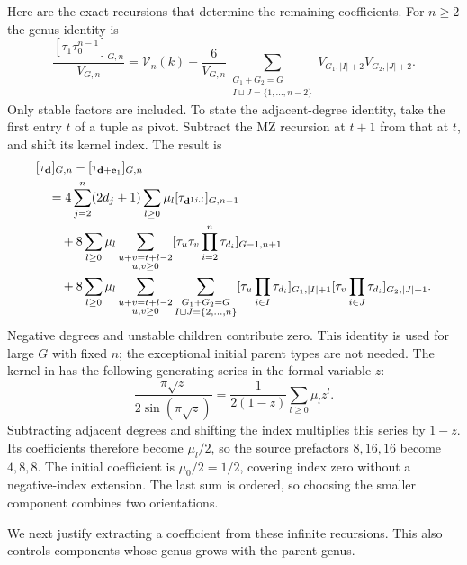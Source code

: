 \documentclass[a4paper,10pt]{article}
\numberwithin{equation}{section}
\theoremstyle{paperplain}
\theoremstyle{paperremark}
\theoremstyle{paperplain}
\begin{document}
Here are the exact recursions that determine the remaining coefficients.
For $n\geq2$ the genus identity is
\begin{equation}\label{eq:a:exact-genus}
 \frac{[\tau_1\tau_0^{n-1}]_{G,n}}{V_{G,n}}
 =\mathcal V_n(k)+\frac6{V_{G,n}}
 \sum_{\substack{G_1+G_2=G\\I\sqcup J=\{1,\ldots,n-2\}}}
        V_{G_1,|I|+2}V_{G_2,|J|+2}.
\end{equation}
Only stable factors are included. To state the adjacent-degree identity,
take the first entry $t$ of a tuple as pivot. Subtract the MZ recursion
at $t+1$ from that at $t$, and shift its kernel index. The result is
\begin{align}
 &[\tau_{\mathbf d}]_{G,n}
       -[\tau_{\mathbf d+\mathbf e_1}]_{G,n}\notag\\
 &\quad=4\sum_{j=2}^n(2d_j+1)\sum_{l\geq0}\mu_l
                            [\tau_{\mathbf d^{1j,l}}]_{G,n-1}\notag\\
 &\qquad+8\sum_{l\geq0}\mu_l
       \sum_{\substack{u+v=t+l-2\\u,v\geq0}}
                   [\tau_u\tau_v\prod_{i=2}^n\tau_{d_i}]_{G-1,n+1}\notag\\
 &\qquad+8\sum_{l\geq0}\mu_l
       \sum_{\substack{u+v=t+l-2\\u,v\geq0}}
       \sum_{\substack{G_1+G_2=G\\I\sqcup J=\{2,\ldots,n\}}}
       [\tau_u\prod_{i\in I}\tau_{d_i}]_{G_1,|I|+1}
       [\tau_v\prod_{i\in J}\tau_{d_i}]_{G_2,|J|+1}.
 \label{eq:a:exact-adjacent}
\end{align}
Negative degrees and unstable children contribute zero. This identity
is used for large $G$ with fixed $n$; the exceptional initial parent
types are not needed. The kernel in \cite[(4.4)--(4.7)]{HMT25} has
the following generating series in the formal variable $z$:
\[
 \frac{\pi\sqrt z}{2\sin(\pi\sqrt z)}
   =\frac1{2(1-z)}\sum_{l\geq0}\mu_l z^l.
\]
Subtracting adjacent degrees and shifting the index multiplies this
series by $1-z$. Its coefficients therefore become $\mu_l/2$, so
the source prefactors $8,16,16$ become $4,8,8$. The initial coefficient
is $\mu_0/2=1/2$, covering index zero without a negative-index
extension. The last sum is ordered, so choosing the smaller component
combines two orientations.

We next justify extracting a coefficient from these infinite recursions.
This also controls components whose genus grows with the parent genus.
\end{document}
